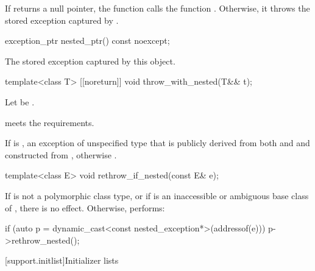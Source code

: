 \begin{itemdescr}
\pnum
\effects
If  returns a null pointer, the function calls the function .
Otherwise, it throws the stored exception captured by .
\end{itemdescr}

%
\begin{itemdecl}
exception_ptr nested_ptr() const noexcept;
\end{itemdecl}

\begin{itemdescr}
\pnum
\returns
The stored exception captured by this  object.
\end{itemdescr}

%
\begin{itemdecl}
template<class T> [[noreturn]] void throw_with_nested(T&& t);
\end{itemdecl}

\begin{itemdescr}
\pnum
Let  be .

\pnum
\expects
{} meets the  requirements.

\pnum
\throws
If 
is ,
an exception of unspecified type that is publicly derived from both
 and 
and constructed from , otherwise
.
\end{itemdescr}

%
\begin{itemdecl}
template<class E> void rethrow_if_nested(const E& e);
\end{itemdecl}

\begin{itemdescr}
\pnum
\effects
If  is not a polymorphic class type, or
if  is an inaccessible or ambiguous base class of ,
there is no effect.
Otherwise, performs:
\begin{codeblock}
if (auto p = dynamic_cast<const nested_exception*>(addressof(e)))
  p->rethrow_nested();
\end{codeblock}
\end{itemdescr}

[support.initlist]{Initializer lists}

